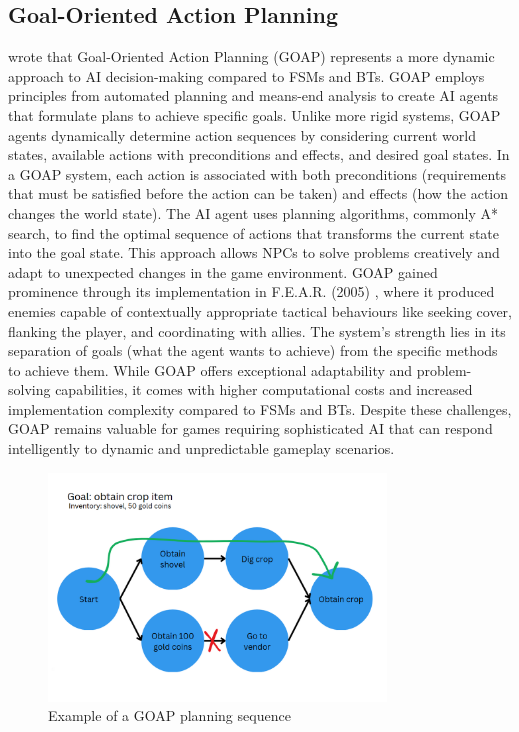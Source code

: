 \subsection{Goal-Oriented Action Planning}

\cite{crashkonijn_goap} wrote that Goal-Oriented Action Planning (GOAP) represents a more dynamic approach to AI decision-making compared to FSMs and BTs. 
GOAP employs principles from automated planning and means-end analysis to create AI agents that formulate plans to achieve specific goals. Unlike more rigid systems, GOAP agents dynamically determine action sequences by considering current world states, available actions with preconditions and effects, and desired goal states.
In a GOAP system, each action is associated with both preconditions (requirements that must be satisfied before the action can be taken) and effects (how the action changes the world state).
The AI agent uses planning algorithms, commonly A* search, to find the optimal sequence of actions that transforms the current state into the goal state. 
This approach allows NPCs to solve problems creatively and adapt to unexpected changes in the game environment.
GOAP gained prominence through its implementation in F.E.A.R. (2005) \cite{thompson2020fear}, where it produced enemies capable of contextually appropriate tactical behaviours like seeking cover, flanking the player, and coordinating with allies. 
The system's strength lies in its separation of goals (what the agent wants to achieve) from the specific methods to achieve them.
While GOAP offers exceptional adaptability and problem-solving capabilities, it comes with higher computational costs and increased implementation complexity compared to FSMs and BTs. Despite these challenges, GOAP remains valuable for games requiring sophisticated AI that can respond intelligently to dynamic and unpredictable gameplay scenarios.

\begin{figure}[H]
    \centering
    \includegraphics[width=0.8\textwidth]{figures/goap.png}
    \caption{Example of a GOAP planning sequence}
    \label{fig:goap}
\end{figure}

